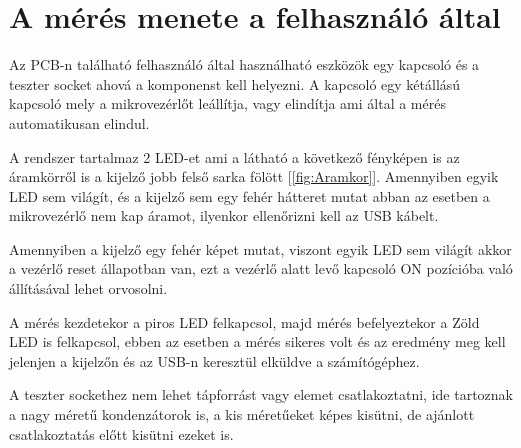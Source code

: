 \section{A mérés menete a felhasználó által}

Az PCB-n található felhasználó által használható eszközök egy kapcsoló és a 
teszter socket ahová a komponenst kell helyezni. A kapcsoló egy kétállású
kapcsoló mely a mikrovezérlőt leállítja, vagy elindítja ami által a mérés
automatikusan elindul.

A rendszer tartalmaz 2 LED-et ami a látható a következő fényképen is az
áramkörről is a kijelző jobb felső sarka fölött [\ref{fig:Aramkor}]. 
Amennyiben egyik LED sem világít, és a kijelző sem egy fehér hátteret
mutat abban az esetben a mikrovezérlő nem kap áramot, ilyenkor ellenőrizni
kell az USB kábelt.

Amennyiben a kijelző egy fehér képet mutat, viszont egyik LED sem világít akkor
a vezérlő reset állapotban van, ezt a vezérlő alatt levő kapcsoló ON 
pozícióba való állításával lehet orvosolni.

A mérés kezdetekor a piros LED felkapcsol, majd mérés befelyeztekor a Zöld 
LED is felkapcsol, ebben az esetben a mérés sikeres volt és az eredmény meg 
kell jelenjen a kijelzőn és az USB-n keresztül elküldve a számítógéphez.

A teszter sockethez nem lehet tápforrást vagy elemet csatlakoztatni, ide tartoznak
a nagy méretű kondenzátorok is, a kis méretűeket képes kisütni, de ajánlott 
csatlakoztatás előtt kisütni ezeket is.

